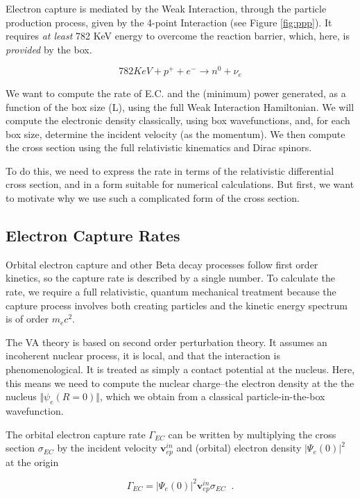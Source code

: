 \documentclass[%
 aip,
 jmp,%
 amsmath,amssymb,
 reprint,%
]{revtex4-1}
\begin{document}
Electron capture is mediated by the Weak Interaction, through the particle production process, given by the 4-point Interaction (see Figure \ref{fig:ppp}).   It requires \emph{at least} 782 KeV energy to overcome the reaction barrier, which, here, is \emph{provided} by the box. 

$$782{KeV}+p^{+}+e^{-}\rightarrow n^{0}+\nu_{e}$$  

We want to compute the rate of E.C. and the (minimum) power generated, as a function of the box size (L), using the full Weak Interaction Hamiltonian.   We will compute the electronic density classically, using box wavefunctions, and, for each box size, determine the incident velocity (as the momentum). We then compute the cross section using the full relativistic kinematics and Dirac spinors.  

To do this, we need to express the rate in terms of the relativistic differential cross section, and in a form suitable for numerical calculations.  
But first, we want to motivate why we use such a complicated form of the cross section.

\subsection{Electron Capture Rates}

Orbital electron capture and other Beta decay processes follow first order kinetics, so the capture rate is described by a single number. 
To calculate the rate, we require a full relativistic, quantum mechanical treatment because the capture process involves both creating particles and the kinetic energy spectrum is of order $m_{e}c^{2}$.

The VA theory is based on second order perturbation theory.  It assumes an incoherent nuclear process, it is local, and that the interaction is phenomenological. It is treated as simply a contact potential at the nucleus. Here, this means we need to compute the nuclear charge--the electron density at the the nucleus $\Vert\psi_{e}(R=0)\Vert$, which we obtain from a classical particle-in-the-box wavefunction.

The orbital electron capture rate $\Gamma_{EC}$  can be written by multiplying the cross section $\sigma_{EC}$ by the incident velocity $\mathbf{v}^{in}_{ep}$ and (orbital) electron density $\big\vert\Psi_{e}(0)\big\vert^{2}$  at the origin

$$\Gamma_{EC}=\big\vert\Psi_{e}(0)\big\vert^{2}\mathbf{v}^{in}_{ep}\sigma_{EC}\;\;.$$
\end{document}
